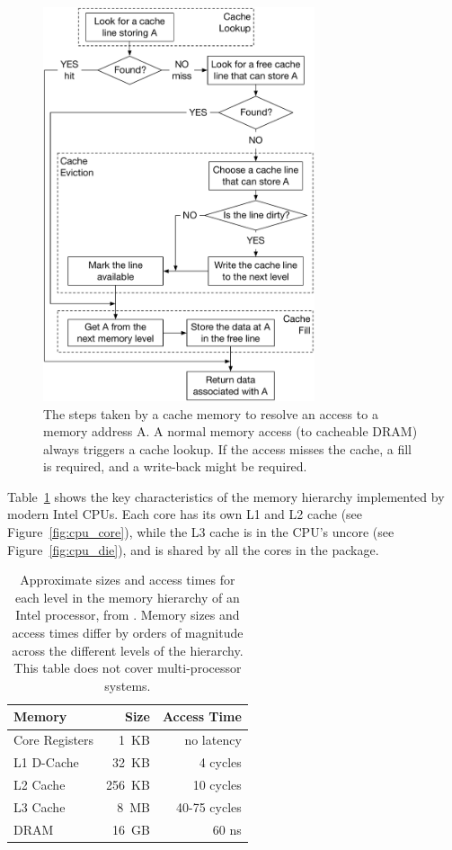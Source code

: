 \begin{figure}[hbt]
  \centering
  \includegraphics[width=80mm]{figures/cache_lookup.pdf}
  \caption{
    The steps taken by a cache memory to resolve an access to a memory address
    A. A normal memory access (to cacheable DRAM) always triggers a cache
    lookup. If the access misses the cache, a fill is required, and a
    write-back might be required.
  }
  \label{fig:cache_lookup}
\end{figure}

Table~\ref{fig:cache_timings} shows the key characteristics of the memory
hierarchy implemented by modern Intel CPUs. Each core has its own L1 and L2
cache (see Figure~\ref{fig:cpu_core}), while the L3 cache is in the CPU's
uncore (see Figure~\ref{fig:cpu_die}), and is shared by all the cores in the
package.


\begin{table}[hbt]
  \centering
  \begin{tabular}{| l | r | r |}
  \hline
  \textbf{Memory} & \textbf{Size} & \textbf{Access Time}\\
  \hline
  Core Registers & 1~KB & no latency \\
  \hline
  L1 D-Cache & 32~KB & 4 cycles \\
  \hline
  L2 Cache & 256~KB & 10 cycles \\
  \hline
  L3 Cache & 8~MB & 40-75 cycles \\
  \hline
  DRAM & 16~GB & 60 ns \\
  \hline
  \end{tabular}
  \caption{
    Approximate sizes and access times for each level in the memory
    hierarchy of an Intel processor, from \cite{intel2010perfanalysis}. Memory
    sizes and access times differ by orders of magnitude across the different
    levels of the hierarchy. This table does not cover multi-processor systems.
  }
  \label{fig:cache_timings}
\end{table}

